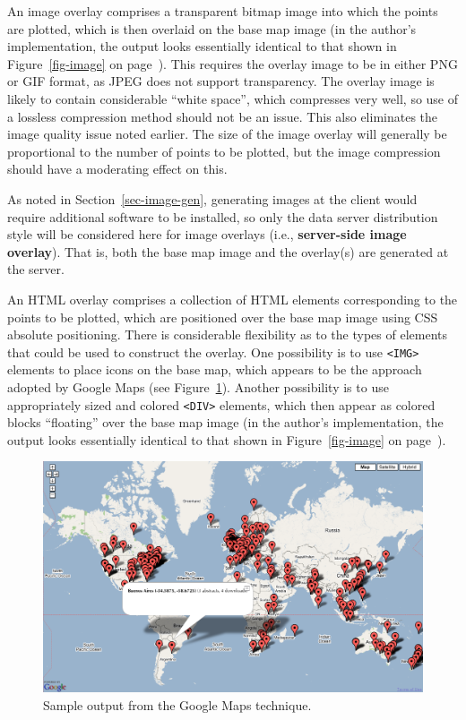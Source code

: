 \documentclass[acmnow]{acmtrans2m}
\begin{document}
An image overlay comprises a transparent bitmap image into which the
points are plotted, which is then overlaid on the base map image (in the
author's implementation, the output looks essentially identical to that
shown in Figure~\ref{fig-image} on page~\pageref{fig-image}). This
requires the overlay image to be in either PNG or GIF format, as JPEG
does not support transparency. The overlay image is likely to contain
considerable ``white space'', which compresses very well, so use of a
lossless compression method should not be an issue. This also eliminates
the image quality issue noted earlier. The size of the image overlay
will generally be proportional to the number of points to be plotted,
but the image compression should have a moderating effect on this.

As noted in Section~\ref{sec-image-gen}, generating images at the client
would require additional software to be installed, so only the data
server distribution style will be considered here for image overlays
(i.e., \textbf{server-side image overlay}). That is, both the base map
image and the overlay(s) are generated at the server.

An HTML overlay comprises a collection of HTML elements corresponding to
the points to be plotted, which are positioned over the base map image
using CSS absolute positioning. There is considerable flexibility as to
the types of elements that could be used to construct the overlay. One
possibility is to use \verb|<IMG>| elements to place icons on the base
map, which appears to be the approach adopted by Google Maps (see
Figure~\ref{fig-google}). Another possibility is to use appropriately
sized and colored \verb|<DIV>| elements, which then appear as colored
blocks ``floating'' over the base map image (in the author's
implementation, the output looks essentially identical to that shown in
Figure~\ref{fig-image} on page~\pageref{fig-image}).


\begin{figure}
	\centering
	\includegraphics[width=\textwidth,keepaspectratio]{GoogleMap-full.png}
	\caption{Sample output from the Google Maps technique.}
	\label{fig-google}
\end{figure}
\end{document}
